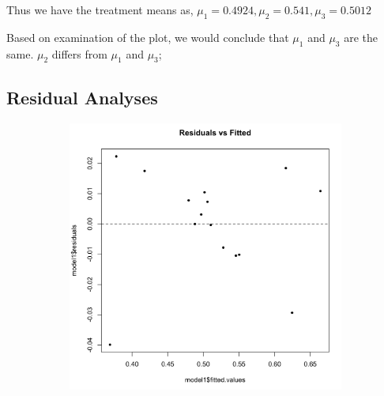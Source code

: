 \documentclass[11pt]{article}
\begin{document}


Thus we have the treatment means as,
$\displaystyle \mu_1=0.4924, \mu_2=0.541, \mu_3=0.5012$

Based on examination of the plot, we would conclude that 
$\displaystyle \mu_1$ and $\displaystyle \mu_3$ are the same.
$\displaystyle \mu_2$ differs from $\displaystyle \mu_1$ and $\displaystyle \mu_3$;

\subsection{Residual Analyses}

\begin{figure}[H]
    \centering
    \begin{subfigure}{0.45\textwidth}
        \includegraphics[width=\textwidth]{../pictures/hw3_q2_qq.png}
    \end{subfigure}
    \begin{subfigure}{0.45\textwidth}

\end{subfigure}
\end{figure}
\end{document}
